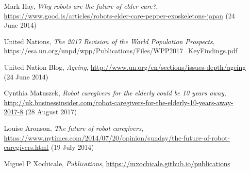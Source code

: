 \documentclass[12pt]{article}
\begin{document}
\begin{thebibliography}{10}

Mark Hay,
{\it Why robots are the future of elder care?},
{\url{https://www.good.is/articles/robots-elder-care-pepper-exoskeletons-japan}} (24 June 2014)


United Nations,
{\it The 2017 Revision of the World Population Prospects},
{\url{https://esa.un.org/unpd/wpp/Publications/Files/WPP2017_KeyFindings.pdf}}


United Nation Blog,
{\it Ageing},
{\url{http://www.un.org/en/sections/issues-depth/ageing}} (24 June 2014)


Cynthia Matuszek,
{\it Robot caregivers for the elderly could be 10 years away},
{\url{http://uk.businessinsider.com/robot-caregivers-for-the-elderly-10-years-away-2017-8}} (28 August 2017)


Louise Aronson,
{\it The future of robot caregivers},
{\url{https://www.nytimes.com/2014/07/20/opinion/sunday/the-future-of-robot-caregivers.html}} (19 July 2014)



Miguel P Xochicale,
{\it Publications},
{\url{https://mxochicale.github.io/publications}}


\end{thebibliography}
\end{document}
